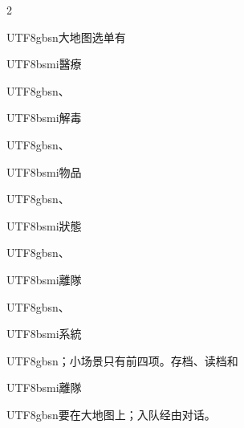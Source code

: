 \begin{paracol}{2}
\begin{CJK}{UTF8}{gbsn}大地图选单有\end{CJK}\begin{CJK}{UTF8}{bsmi}醫療\end{CJK}\begin{CJK}{UTF8}{gbsn}、\end{CJK}\begin{CJK}{UTF8}{bsmi}解毒\end{CJK}\begin{CJK}{UTF8}{gbsn}、\end{CJK}\begin{CJK}{UTF8}{bsmi}物品\end{CJK}\begin{CJK}{UTF8}{gbsn}、\end{CJK}\begin{CJK}{UTF8}{bsmi}狀態\end{CJK}\begin{CJK}{UTF8}{gbsn}、\end{CJK}\begin{CJK}{UTF8}{bsmi}離隊\end{CJK}\begin{CJK}{UTF8}{gbsn}、\end{CJK}\begin{CJK}{UTF8}{bsmi}系統\end{CJK}\begin{CJK}{UTF8}{gbsn}；小场景只有前四项。存档、读档和\end{CJK}\begin{CJK}{UTF8}{bsmi}離隊\end{CJK}\begin{CJK}{UTF8}{gbsn}要在大地图上；入队经由对话。\end{CJK}\par

\end{paracol}
